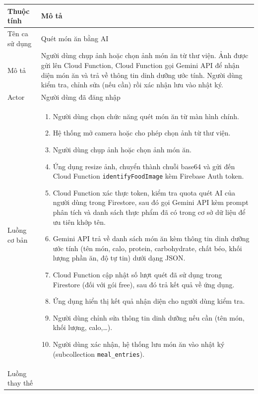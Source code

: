 \begin{longtable}{|p{4cm}|p{11cm}|}
    \hline
    \textbf{Thuộc tính} & \textbf{Mô tả} \\
    \hline
    \endhead
    \hline
    \endfoot
    Tên ca sử dụng & Quét món ăn bằng AI \\
    \hline
    Mô tả & Người dùng chụp ảnh hoặc chọn ảnh món ăn từ thư viện. Ảnh được gửi lên Cloud Function, Cloud Function gọi Gemini API để nhận diện món ăn và trả về thông tin dinh dưỡng ước tính. Người dùng kiểm tra, chỉnh sửa (nếu cần) rồi xác nhận lưu vào nhật ký. \\
    \hline
    Actor & Người dùng đã đăng nhập \\
    \hline
    Luồng cơ bản &
        \begin{enumerate}[nosep]
            \item Người dùng chọn chức năng quét món ăn từ màn hình chính.
            \item Hệ thống mở camera hoặc cho phép chọn ảnh từ thư viện.
            \item Người dùng chụp ảnh hoặc chọn ảnh món ăn.
            \item Ứng dụng resize ảnh, chuyển thành chuỗi base64 và gửi đến Cloud Function \texttt{identify\-Food\-Image} kèm Firebase Auth token.
            \item Cloud Function xác thực token, kiểm tra quota quét AI của người dùng trong Firestore, sau đó gọi Gemini API kèm prompt phân tích và danh sách thực phẩm đã có trong cơ sở dữ liệu để ưu tiên khớp tên.
            \item Gemini API trả về danh sách món ăn kèm thông tin dinh dưỡng ước tính (tên món, calo, protein, carbohydrate, chất béo, khối lượng phần ăn, độ tự tin) dưới dạng JSON.
            \item Cloud Function cập nhật số lượt quét đã sử dụng trong Firestore (đối với gói free), sau đó trả kết quả về ứng dụng.
            \item Ứng dụng hiển thị kết quả nhận diện cho người dùng kiểm tra.
            \item Người dùng chỉnh sửa thông tin dinh dưỡng nếu cần (tên món, khối lượng, calo,\ldots).
            \item Người dùng xác nhận, hệ thống lưu món ăn vào nhật ký (subcollection \texttt{meal\_entries}).
        \end{enumerate} \\
    \hline
    Luồng thay thế &
        \begin{enumerate}[nosep]

\end{enumerate}
\end{longtable}
